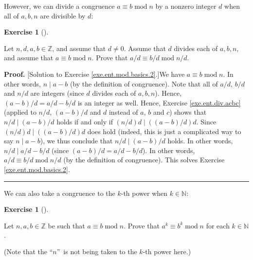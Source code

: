 \documentclass[numbers=enddot,12pt,final,onecolumn,notitlepage]{scrartcl}%
\newcounter{exer}
\numberwithin{exer}{subsection}
\theoremstyle{definition}
\newtheorem{exmp}[exer]{Exercise}
\newenvironment{exercise}[1][]
{\begin{exmp}[#1]\begin{leftbar}}
{\end{leftbar}\end{exmp}}
\newenvironment{fineprint}{\begin{small}}{\end{small}}
\newenvironment{proof}[1][Proof]{\noindent\textbf{#1.} }{\ \rule{0.5em}{0.5em}}
\begin{document}
However, we can divide a congruence $a\equiv b\operatorname{mod}n$ by a
nonzero integer $d$ when all of $a,b,n$ are divisible by $d$:

\begin{exercise}
\label{exe.ent.mod.basics.2}Let $n,d,a,b\in\mathbb{Z}$, and assume that
$d\neq0$. Assume that $d$ divides each of $a,b,n$, and assume that $a\equiv
b\operatorname{mod}n$. Prove that $a/d\equiv b/d\operatorname{mod}n/d$.
\end{exercise}

\begin{fineprint}
\begin{proof}
[Solution to Exercise \ref{exe.ent.mod.basics.2}.]We have $a\equiv
b\operatorname{mod}n$. In other words, $n\mid a-b$ (by the definition of
congruence). Note that all of $a/d$, $b/d$ and $n/d$ are integers (since $d$
divides each of $a,b,n$). Hence, $\left(  a-b\right)  /d=a/d-b/d$ is an
integer as well. Hence, Exercise \ref{exe.ent.div.acbc} (applied to $n/d$,
$\left(  a-b\right)  /d$ and $d$ instead of $a$, $b$ and $c$) shows that
$n/d\mid\left(  a-b\right)  /d$ holds if and only if $\left(  n/d\right)
d\mid\left(  \left(  a-b\right)  /d\right)  d$. Since $\left(  n/d\right)
d\mid\left(  \left(  a-b\right)  /d\right)  d$ does hold (indeed, this is just
a complicated way to say $n\mid a-b$), we thus conclude that $n/d\mid\left(
a-b\right)  /d$ holds. In other words, $n/d\mid a/d-b/d$ (since $\left(
a-b\right)  /d=a/d-b/d$). In other words, $a/d\equiv b/d\operatorname{mod}n/d$
(by the definition of congruence). This solves Exercise
\ref{exe.ent.mod.basics.2}.
\end{proof}
\end{fineprint}

We can also take a congruence to the $k$-th power when $k\in\mathbb{N}$:

\begin{exercise}
\label{exe.ent.mod.basics.k-power}Let $n,a,b\in\mathbb{Z}$ be such that
$a\equiv b\operatorname{mod}n$. Prove that $a^{k}\equiv b^{k}%
\operatorname{mod}n$ for each $k\in\mathbb{N}$.
\end{exercise}

(Note that the \textquotedblleft$n$\textquotedblright\ is not being taken to
the $k$-th power here.)
\end{document}
